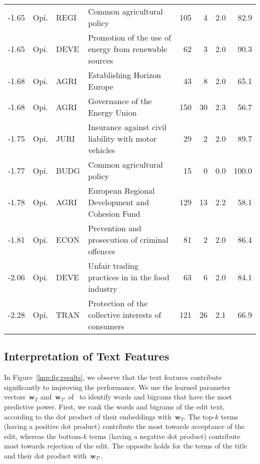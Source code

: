\begin{sidewaystable}
\begin{tabular}{rlllrrrr}
		\midrule

		-1.65 & Opi. & REGI  & Common agricultural policy                                    & 105      & 4        & 2.0            & 82.9    \\
		-1.65 & Opi. & DEVE  & Promotion of the use of energy from renewable sources         & 62       & 3        & 2.0            & 90.3    \\
		-1.68 & Opi. & AGRI  & Establishing Horizon Europe                                   & 43       & 8        & 2.0            & 65.1    \\
		-1.68 & Opi. & AGRI  & Governance of the Energy Union                                & 150      & 30       & 2.3            & 56.7    \\
		-1.75 & Opi. & JURI  & Insurance against civil liability with motor vehicles         & 29       & 2        & 2.0            & 89.7    \\
		-1.77 & Opi. & BUDG  & Common agricultural policy                                    & 15       & 0        & 0.0            & 100.0   \\
		-1.78 & Opi. & AGRI  & European Regional Development and Cohesion Fund               & 129      & 13       & 2.2            & 58.1    \\
		-1.81 & Opi. & ECON  & Prevention and prosecution of criminal offences               & 81       & 2        & 2.0            & 86.4    \\
		-2.06 & Opi. & DEVE  & Unfair trading practices in in the food industry              & 63       & 6        & 2.0            & 84.1    \\
		-2.28 & Opi. & TRAN  & Protection of the collective interests of consumers           & 121      & 26       & 2.1            & 66.9    \\

		\bottomrule
	\end{tabular}
\end{sidewaystable}

\subsection{Interpretation of Text Features}
\label{lmp:sec:intertext}

In Figure~\ref{lmp:fig:results}, we observe that the text features contribute significantly to improving the performance.
We use the learned parameter vectors~$\boldsymbol{w}_T$ and~$\boldsymbol{w}_{T'}$ of \ to identify words and bigrams that have the most predictive power.
First, we rank the words and bigrams of the edit text, according to the dot product of their embeddings with~$\boldsymbol{w}_T$.
The top-$k$ terms (having a positive dot product) contribute the most towards acceptance of the edit, whereas the bottom-$k$ terms (having a negative dot product) contribute most towards rejection of the edit.
The opposite holds for the terms of the title and their dot product with~$\boldsymbol{w}_{T'}$.

